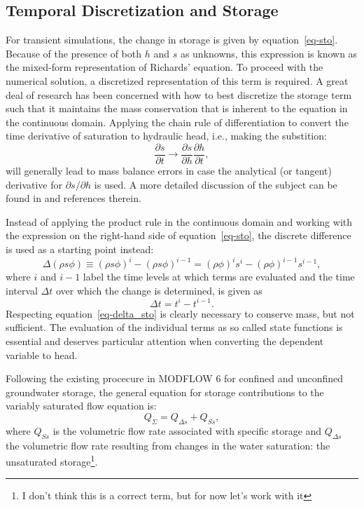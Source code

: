 \documentclass[fleqn]{article}
\begin{document}
\subsection{Temporal Discretization and Storage}
For transient simulations, the change in storage is given by
equation~\ref{eq-sto}. Because of the presence of both $h$ and
$s$ as unknowns, this expression is known as the mixed-form
representation of Richards' equation. To proceed with the
numerical solution, a discretized representation of this
term is required. A great deal of research has been concerned
with how to best discretize the storage term such that it maintains
the mass conservation that is inherent to the equation in
the continuous domain. Applying the chain rule of differentiation
to convert the time derivative of saturation to hydraulic head,
i.e., making the substition:
\begin{equation}
  \frac{\partial s}{\partial t} \rightarrow
  \frac{\partial s}{\partial h} 
  \frac{\partial h}{\partial t},
\end{equation}
will generally lead to mass balance errors in case the analytical
(or tangent) derivative for $\partial s/\partial h$ is used. 
A more detailed discussion of the subject can be found in
\cite{rathfelder-1994} and references therein.

Instead of applying the product rule in the continuous domain
and working with the expression on the right-hand side of 
equation~\ref{eq-sto}, the discrete difference is used
as a starting point instead:
\begin{equation}
  \Delta \left ( \rho s \phi \right ) \equiv
  \left ( \rho s \phi \right )^{i} - 
  \left ( \rho s \phi \right )^{i-1} =
  \left ( \rho \phi \right )^{i} s^{i} - 
  \left ( \rho \phi \right )^{i-1} s^{i-1},
  \label{eq-delta_sto}
\end{equation}
where $i$ and $i-1$ label the time levels at which terms
are evaluated and the time interval $\Delta t$ over which the 
change is determined, is given as
\begin{equation}
  \Delta t = t^i - t^{i-1}.
\end{equation}
Respecting equation~\ref{eq-delta_sto} is clearly necessary to conserve
mass, but not sufficient. The evaluation of the individual terms
as so called state functions is essential and deserves particular
attention when converting the dependent variable to head.

Following the existing procecure in MODFLOW 6 for confined and
unconfined groundwater storage, the general equation for storage
contributions to the variably saturated flow equation is:
\begin{equation}
  Q_{\Sigma} = Q_{\Delta s} + Q_{Ss},
\end{equation}
where $Q_{Ss}$ is the volumetric flow rate associated with specific
storage and $Q_{\Delta s}$ the volumetric flow rate resulting from
changes in the water saturation: the unsaturated storage\footnote{
  I don't think this is a correct term,
  but for now let's work with it
}.
\end{document}
